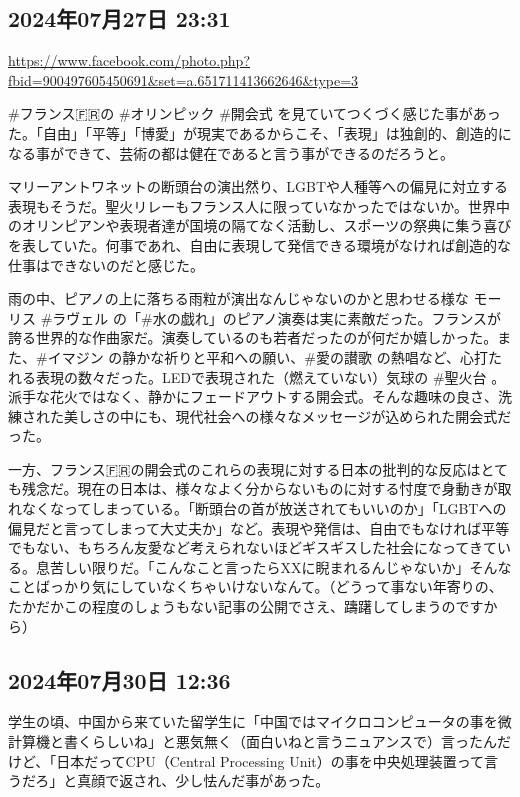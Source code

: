 \documentclass[facebook_diary.tex]{subfiles}
\begin{document}
\subsection*{2024年07月27日 23:31}

\url{https://www.facebook.com/photo.php?fbid=900497605450691&set=a.651711413662646&type=3}




\#フランス🇫🇷の \#オリンピック \#開会式 を見ていてつくづく感じた事があった。「自由」「平等」「博愛」が現実であるからこそ、「表現」は独創的、創造的になる事ができて、芸術の都は健在であると言う事ができるのだろうと。

マリーアントワネットの断頭台の演出然り、LGBTや人種等への偏見に対立する表現もそうだ。聖火リレーもフランス人に限っていなかったではないか。世界中のオリンピアンや表現者達が国境の隔てなく活動し、スポーツの祭典に集う喜びを表していた。何事であれ、自由に表現して発信できる環境がなければ創造的な仕事はできないのだと感じた。

雨の中、ピアノの上に落ちる雨粒が演出なんじゃないのかと思わせる様な モーリス \#ラヴェル の「\#水の戯れ」のピアノ演奏は実に素敵だった。フランスが誇る世界的な作曲家だ。演奏しているのも若者だったのが何だか嬉しかった。また、\#イマジン の静かな祈りと平和への願い、\#愛の讃歌 の熱唱など、心打たれる表現の数々だった。LEDで表現された（燃えていない）気球の \#聖火台 。派手な花火ではなく、静かにフェードアウトする開会式。そんな趣味の良さ、洗練された美しさの中にも、現代社会への様々なメッセージが込められた開会式だった。

一方、フランス🇫🇷の開会式のこれらの表現に対する日本の批判的な反応はとても残念だ。現在の日本は、様々なよく分からないものに対する忖度で身動きが取れなくなってしまっている。「断頭台の首が放送されてもいいのか」「LGBTへの偏見だと言ってしまって大丈夫か」など。表現や発信は、自由でもなければ平等でもない、もちろん友愛など考えられないほどギスギスした社会になってきている。息苦しい限りだ。「こんなこと言ったらXXに睨まれるんじゃないか」そんなことばっかり気にしていなくちゃいけないなんて。（どうって事ない年寄りの、たかだかこの程度のしょうもない記事の公開でさえ、躊躇してしまうのですから）

\subsection*{2024年07月30日 12:36}

学生の頃、中国から来ていた留学生に「中国ではマイクロコンピュータの事を微計算機と書くらしいね」と悪気無く（面白いねと言うニュアンスで）言ったんだけど、「日本だってCPU（Central Processing Unit）の事を中央処理装置って言うだろ」と真顔で返され、少し怯んだ事があった。
\end{document}
